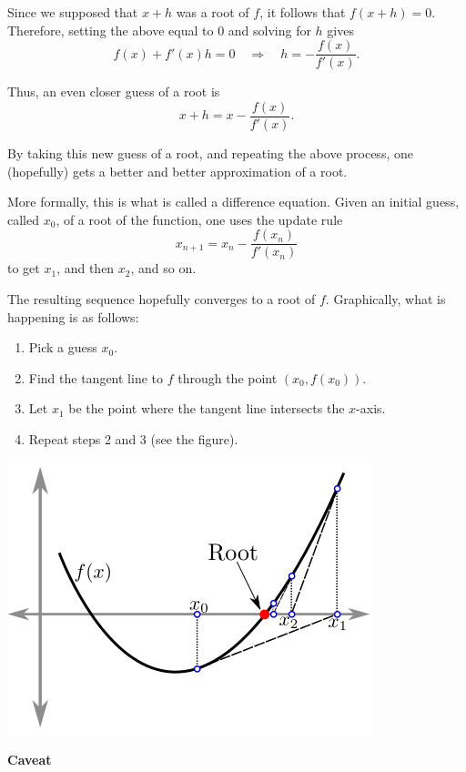 \documentclass[twoside,openright,titlepage,a4paper]{book}
\begin{document}
\begin{sloppypar}
Since we supposed that $x+h$ was a root of $f$, it follows that $f(x+h)=0$. Therefore, setting the above equal to 0 and solving for $h$ gives \[ f(x) + f'(x)h = 0 \quad \Rightarrow \quad h = -\frac{f(x)}{f'(x)}. \]

Thus, an even closer guess of a root is \[ x + h = x - \frac{f(x)}{f'(x)}. \]

By taking this new guess of a root, and repeating the above process, one (hopefully) gets a better and better approximation of a root.

More formally, this is what is called a difference equation. Given an initial guess, called $x_0$, of a root of the function, one uses the update rule
\begin{equation*}
x_{n+1} = x_n - \frac{f(x_n)}{f'(x_n)}
\end{equation*}
to get $x_1$, and then $x_2$, and so on.

The resulting sequence hopefully converges to a root of $f$. Graphically, what is happening is as follows:
\begin{enumerate}
\item Pick a guess $x_0$.
\item Find the tangent line to $f$ through the point $(x_0,f(x_0))$.
\item Let $x_1$ be the point where the tangent line intersects the $x$-axis.
\item Repeat steps 2 and 3 (see the figure).
\end{enumerate}
\begin{center}\includegraphics[scale=0.6]{NewtonsMethod}\end{center}
\bigbreak
\noindent \textbf{Caveat}\\


\end{sloppypar}
\end{document}

